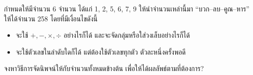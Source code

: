 \question{}

กำหนดให้มีจำนวน 6 จำนวน ได้แก่ 1, 2, 5, 6, 7, 9 
ให้นำจำนวนเหล่านี้มา ``บวก{\hrsp--\hrsp}ลบ{\hrsp--\hrsp}คูณ{\hrsp--\hrsp}หาร'' 
ให้ได้จำนวน 258 โดยที่มีเงื่อนไขดังนี้
\begin{itemize}
    \item จะใช้ $+, -, \times, \div$ อย่างไรก็ได้ และจะจัดกลุ่มหรือใส่วงเล็บอย่างไรก็ได้
    \item จะใช้ตัวเลขในลำดับใดก็ได้ แต่ต้องใช้ตัวเลขทุกตัว ตัวละหนึ่งครั้งพอดี
\end{itemize}

\noindent
จงหาวิธีการจัดนิพจน์ให้กับจำนวนทั้งหมดข้างต้น เพื่อให้ได้ผลลัพธ์ตามที่ต้องการ?

